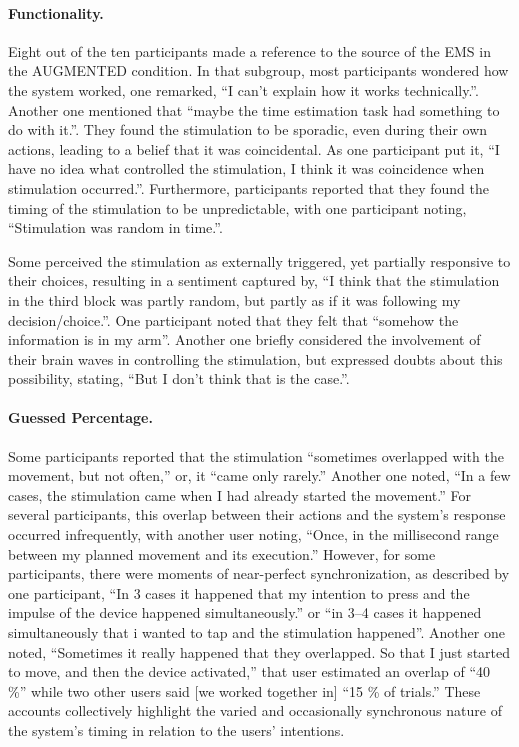 \paragraph{Functionality.} Eight out of the ten participants made a reference to the source of the EMS in the AUGMENTED condition. In that subgroup, most participants wondered how the system worked, one remarked, ``I can't explain how it works technically.''. Another one mentioned that ``maybe the time estimation task had something to do with it.''. They found the stimulation to be sporadic, even during their own actions, leading to a belief that it was coincidental. As one participant put it, ``I have no idea what controlled the stimulation, I think it was coincidence when stimulation occurred.''. Furthermore, participants reported that they found the timing of the stimulation to be unpredictable, with one participant noting, ``Stimulation was random in time.''. 

Some perceived the stimulation as externally triggered, yet partially responsive to their choices, resulting in a sentiment captured by, ``I think that the stimulation in the third block was partly random, but partly as if it was following my decision/choice.''. One participant noted that they felt that ``somehow the information is in my arm''. Another one briefly considered the involvement of their brain waves in controlling the stimulation, but expressed doubts about this possibility, stating, ``But I don't think that is the case.''.

\paragraph{Guessed Percentage.} 
Some participants reported that the stimulation ``sometimes overlapped with the movement, but not often,'' or, it ``came only rarely.'' Another one noted, ``In a few cases, the stimulation came when I had already started the movement.'' For several participants, this overlap between their actions and the system's response occurred infrequently, with another user noting, ``Once, in the millisecond range between my planned movement and its execution.'' However, for some participants, there were moments of near-perfect synchronization, as described by one participant, ``In 3 cases it happened that my intention to press and the impulse of the device happened simultaneously.'' or ``in 3--4 cases it happened simultaneously that i wanted to tap and the stimulation happened''. Another one noted, ``Sometimes it really happened that they overlapped. So that I just started to move, and then the device activated,'' that user estimated an overlap of ``40 \%'' while two other users said [we worked together in] ``15 \% of trials.'' These accounts collectively highlight the varied and occasionally synchronous nature of the system's timing in relation to the users' intentions.

